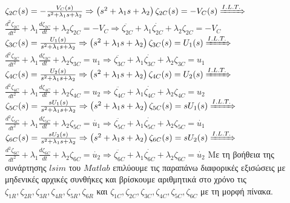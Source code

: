 \documentclass[12pt]{article}
\begin{document}
\newline
\newline
$\zeta_{2C}(s)=-\frac{V_{C}(s)}{s^2+\lambda_{1}s+\lambda_{2}} \Rightarrow \left( s^2+\lambda_{1}s+\lambda_{2} \right)\zeta_{2C}(s) = -V_{C}(s)\xRightarrow{I.L.T.}$
\newline
$ \frac{d^2\zeta_{2C}}{dt^2} +\lambda_{1}\frac{d\zeta_{2C}}{dt}+\lambda_{2}\zeta_{2C}=-V_{C} \Rightarrow \ddot{\zeta_{2C}} +\lambda_{1}\dot{\zeta_{2C}}+\lambda_{2}\zeta_{2C}=-V_{C}$
\newline
\newline
$\zeta_{3C}(s)=\frac{U_{1}(s)}{s^2+\lambda_{1}s+\lambda_{2}} \Rightarrow \left( s^2+\lambda_{1}s+\lambda_{2} \right)\zeta_{3C}(s) = U_{1}(s)\xRightarrow{I.L.T.}$
\newline
$ \frac{d^2\zeta_{3C}}{dt^2} +\lambda_{1}\frac{d\zeta_{3C}}{dt}+\lambda_{2}\zeta_{3C}=u_{1} \Rightarrow \ddot{\zeta_{3C}} +\lambda_{1}\dot{\zeta_{3C}}+\lambda_{2}\zeta_{3C}=u_{1}$
\newline
\newline
$\zeta_{4C}(s)=\frac{U_{2}(s)}{s^2+\lambda_{1}s+\lambda_{2}} \Rightarrow \left( s^2+\lambda_{1}s+\lambda_{2} \right)\zeta_{4C}(s) = U_{2}(s)\xRightarrow{I.L.T.}$
\newline
$ \frac{d^2\zeta_{4C}}{dt^2} +\lambda_{1}\frac{d\zeta_{4C}}{dt}+\lambda_{2}\zeta_{4C}=u_{2} \Rightarrow \ddot{\zeta_{4C}} +\lambda_{1}\dot{\zeta_{4C}}+\lambda_{2}\zeta_{4C}=u_{2}$
\newline
\newline
$\zeta_{5C}(s)=\frac{sU_{1}(s)}{s^2+\lambda_{1}s+\lambda_{2}} \Rightarrow \left( s^2+\lambda_{1}s+\lambda_{2} \right)\zeta_{5C}(s) = sU_{1}(s)
\xRightarrow{I.L.T.}$
\newline
$ \frac{d^2\zeta_{5C}}{dt^2} +\lambda_{1}\frac{d\zeta_{5C}}{dt}+\lambda_{2}\zeta_{5C}=\dot{u_{1}} \Rightarrow \ddot{\zeta_{5C}} +\lambda_{1}\dot{\zeta_{5C}}+\lambda_{2}\zeta_{5C}=\dot{u_{1}}$
\newline
\newline
$\zeta_{6C}(s)=\frac{sU_{2}(s)}{s^2+\lambda_{1}s+\lambda_{2}} \Rightarrow \left( s^2+\lambda_{1}s+\lambda_{2} \right)\zeta_{6C}(s) = sU_{2}(s)
\xRightarrow{I.L.T.}$
\newline
$ \frac{d^2\zeta_{6C}}{dt^2} +\lambda_{1}\frac{d\zeta_{6C}}{dt}+\lambda_{2}\zeta_{6C}=\dot{u_{2}} \Rightarrow \ddot{\zeta_{6C}} +\lambda_{1}\dot{\zeta_{6C}}+\lambda_{2}\zeta_{6C}=\dot{u_{2}}$
\newline
\newline
Με τη βοήθεια της συνάρτησης $lsim$ του $Matlab$ επιλύουμε τις παραπάνω διαφορικές εξισώσεις με μηδενικές αρχικές συνθήκες και βρίσκουμε αριθμητικά στο χρόνο τις $\zeta_{1R},\zeta_{2R},\zeta_{3R},\zeta_{4R},\zeta_{5R},\zeta_{6R}$ και $\zeta_{1C},\zeta_{2C},\zeta_{3C},\zeta_{4C},\zeta_{5C},\zeta_{6C}$ με τη μορφή πίνακα.
\end{document}
